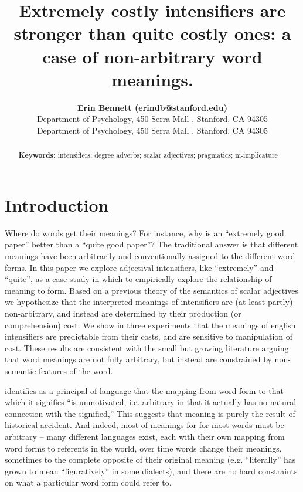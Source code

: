 \documentclass[10pt,letterpaper]{article}
\title{Extremely costly intensifiers are stronger than quite costly ones: a case of non-arbitrary word meanings.}
\author{{\large \bf Erin Bennett (erindb@stanford.edu)} \\
  Department of Psychology, 450 Serra Mall , Stanford, CA 94305
  \AND {\large \bf Noah Goodman (ngoodman@stanford.edu)} \\
  Department of Psychology, 450 Serra Mall , Stanford, CA 94305}
\begin{document}
\maketitle


\begin{abstract}


\textbf{Keywords:} 
intensifiers; degree adverbs; scalar adjectives; pragmatics; m-implicature
\end{abstract}


\section{Introduction}

Where do words get their meanings? For instance, why is an ``extremely good paper'' better than a ``quite good paper''? The traditional answer \cite{saussure} is that different meanings have been arbitrarily and conventionally assigned to the different word forms.
In this paper we explore adjectival intensifiers, like ``extremely'' and ``quite'', as a case study in which to empirically explore the relationship of meaning to form.
Based on a previous theory of the semantics of scalar adjectives we hypothesize that the interpreted meanings of intensifiers are (at least partly) non-arbitrary, and instead are determined by their production (or comprehension) cost. 
We show in three experiments that the meanings of english intensifiers are predictable from their costs, and are sensitive to manipulation of cost.
These results are consistent with the small but growing literature arguing that word meanings are not fully arbitrary, but instead are constrained by non-semantic features of the word. 


 identifies as a principal of language that the mapping from word form to that which it signifies ``is unmotivated, i.e. arbitrary in that it actually has no natural connection with the signified,'' This suggests that meaning is purely the result of historical accident. And indeed, most of meanings for for most words must be arbitrary -- many different languages exist, each with their own mapping from word forms to referents in the world, over time words change their meanings, sometimes to the complete opposite of their original meaning (e.g. ``literally'' has grown to mean ``figuratively'' in some dialects), and there are no hard constraints on what a particular word form could refer to.
\end{document}
